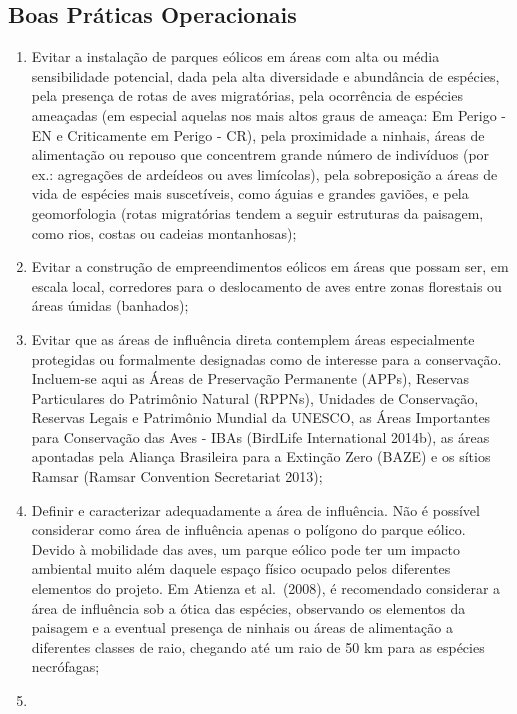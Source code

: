 \documentclass[
]{scrbook}
\begin{document}
\hypertarget{boas-praticas}{%
\subsection{Boas Práticas Operacionais}\label{boas-praticas}}

\begin{enumerate}
\def\labelenumi{\arabic{enumi}.}
\item
  Evitar a instalação de parques eólicos em áreas com alta ou média sensibilidade potencial, dada pela alta diversidade e abundância de espécies, pela presença de rotas de aves migratórias, pela ocorrência de espécies ameaçadas (em especial aquelas nos mais altos graus de ameaça: Em Perigo - EN e Criticamente em Perigo - CR), pela proximidade a ninhais, áreas de alimentação ou repouso que concentrem grande número de indivíduos (por ex.: agregações de ardeídeos ou aves limícolas), pela sobreposição a áreas de vida de espécies mais suscetíveis, como águias e grandes gaviões, e pela geomorfologia (rotas migratórias tendem a seguir estruturas da paisagem, como rios, costas ou cadeias montanhosas);
\item
  Evitar a construção de empreendimentos eólicos em áreas que possam ser, em escala local, corredores para o deslocamento de aves entre zonas florestais ou áreas úmidas (banhados);
\item
  Evitar que as áreas de influência direta contemplem áreas especialmente protegidas ou formalmente designadas como de interesse para a conservação. Incluem-se aqui as Áreas de Preservação Permanente (APPs), Reservas Particulares do Patrimônio Natural (RPPNs), Unidades de Conservação, Reservas Legais e Patrimônio Mundial da UNESCO, as Áreas Importantes para Conservação das Aves - IBAs (BirdLife International 2014b), as áreas apontadas pela Aliança Brasileira para a Extinção Zero (BAZE) e os sítios Ramsar (Ramsar Convention Secretariat 2013);
\item
  Definir e caracterizar adequadamente a área de influência. Não é possível considerar como área de influência apenas o polígono do parque eólico. Devido à mobilidade das aves, um parque eólico pode ter um impacto ambiental muito além daquele espaço físico ocupado pelos diferentes elementos do projeto. Em Atienza et al.~(2008), é recomendado considerar a área de influência sob a ótica das espécies, observando os elementos da paisagem e a eventual presença de ninhais ou áreas de alimentação a diferentes classes de raio, chegando até um raio de 50 km para as espécies necrófagas;
\item

\end{enumerate}
\end{document}
